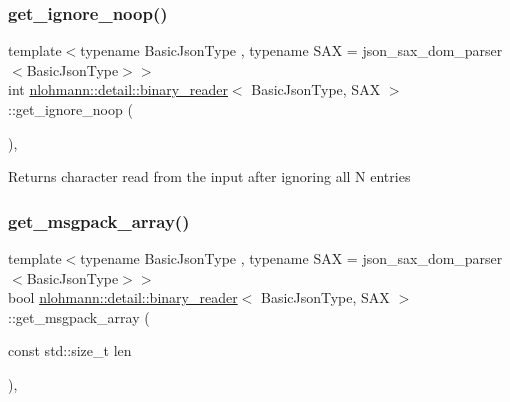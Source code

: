 \subsubsection{\texorpdfstring{get\_ignore\_noop()}{get\_ignore\_noop()}}
{\footnotesize\ttfamily template$<$typename Basic\+Json\+Type , typename S\+AX  = json\+\_\+sax\+\_\+dom\+\_\+parser$<$\+Basic\+Json\+Type$>$$>$ \\
int \mbox{\hyperlink{classnlohmann_1_1detail_1_1binary__reader}{nlohmann\+::detail\+::binary\+\_\+reader}}$<$ Basic\+Json\+Type, S\+AX $>$\+::get\+\_\+ignore\+\_\+noop (\begin{DoxyParamCaption}{ }\end{DoxyParamCaption})\hspace{0.3cm}{\ttfamily [inline]}, {\ttfamily [private]}}

\begin{DoxyReturn}{Returns}
character read from the input after ignoring all \textquotesingle{}N\textquotesingle{} entries 
\end{DoxyReturn}
\mbox{\label{classnlohmann_1_1detail_1_1binary__reader_a09d3eed7523da6f61e7ffa98823aae2b}} 
\subsubsection{\texorpdfstring{get\_msgpack\_array()}{get\_msgpack\_array()}}
{\footnotesize\ttfamily template$<$typename Basic\+Json\+Type , typename S\+AX  = json\+\_\+sax\+\_\+dom\+\_\+parser$<$\+Basic\+Json\+Type$>$$>$ \\
bool \mbox{\hyperlink{classnlohmann_1_1detail_1_1binary__reader}{nlohmann\+::detail\+::binary\+\_\+reader}}$<$ Basic\+Json\+Type, S\+AX $>$\+::get\+\_\+msgpack\+\_\+array (\begin{DoxyParamCaption}\item[{const std\+::size\+\_\+t}]{len }\end{DoxyParamCaption})\hspace{0.3cm}{\ttfamily [inline]}, {\ttfamily [private]}}


